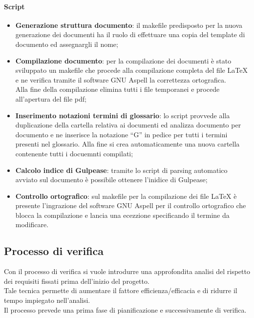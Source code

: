 			\paragraph{Script} %
			\label{par:script_doc}
				\begin{itemize}
					\item \textbf{Generazione struttura documento}: il makefile predisposto per la nuova generazione dei documenti ha il ruolo di effettuare una copia del template di documento ed assegnargli il nome;
					\item \textbf{Compilazione documento}: per la compilazione dei documenti è stato sviluppato un makefile che procede alla compilazione completa del file \LaTeX{} e ne verifica tramite il software GNU Aspell la correttezza ortografica.\\
					Alla fine della compilazione elimina tutti i file temporanei e procede all'apertura del file pdf;
					\item \textbf{Inserimento notazioni termini di glossario}: lo script provvede alla duplicazione della cartella relativa ai documenti ed analizza documento per documento e ne inserisce la notazione  ``G'' in pedice per tutti i termini presenti nel glossario. Alla fine si crea automaticamente una nuova cartella contenente tutti i docuemnti compilati;
					\item \textbf{Calcolo indice di Gulpease}: tramite lo script di parsing automatico avviato sul documento è possibile ottenere l'inidice di Gulpease;
					\item \textbf{Controllo ortografico}: sul makefile per la compilazione dei file \LaTeX{} è presente l'ingrazione del software GNU Aspell per il controllo ortografico che blocca la compilazione e lancia una ecezzione specificando il termine da modificare.
				\end{itemize}
			


	\subsection{Processo di verifica}
	Con il processo di verifica si vuole introdurre una approfondita analisi del rispetto dei requisiti fissati prima dell'inizio del progetto.\\
	Tale tecnica permette di aumentare il fattore efficienza/efficacia e di ridurre il tempo impiegato nell'analisi.\\
	Il processo prevede una prima fase di pianificazione e successivamente di verifica.

